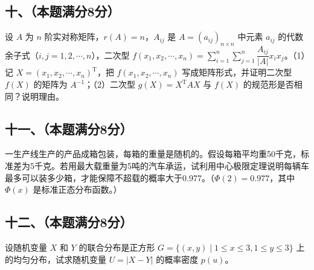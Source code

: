 \documentclass[UTF8,12pt]{ctexart}
\begin{document}
\subsection*{十、（本题满分8分）}

设 \(\displaystyle A\) 为 \(\displaystyle n\) 阶实对称矩阵，\(\displaystyle r(A)=n\)，\(\displaystyle A_{ij}\) 是 \(\displaystyle A=(a_{ij})_{n\times n}\) 中元素 \(\displaystyle a_{ij}\) 的代数余子式（\(\displaystyle i,\allowbreak j=1,\allowbreak 2,\allowbreak \cdots,\allowbreak n\)），二次型 \(\displaystyle f(x_1,\allowbreak x_2,\allowbreak \cdots,\allowbreak x_n)=\displaystyle \sum_{i=1}^n\displaystyle \sum_{j=1}^n\dfrac{\displaystyle A_{ij}}{\displaystyle |A|}x_ix_j\)。（1）记 \(\displaystyle X=(x_1,\allowbreak x_2,\allowbreak \cdots,\allowbreak x_n)^{\mathrm T}\)，把 \(\displaystyle f(x_1,\allowbreak x_2,\allowbreak \cdots,\allowbreak x_n)\) 写成矩阵形式，并证明二次型 \(\displaystyle f(X)\) 的矩阵为 \(\displaystyle A^{-1}\)；（2）二次型 \(\displaystyle g(X)=X^{\mathrm T}AX\) 与 \(\displaystyle f(X)\) 的规范形是否相同？说明理由。


\subsection*{十一、（本题满分8分）}

一生产线生产的产品成箱包装，每箱的重量是随机的。假设每箱平均重50千克，标准差为5千克。若用最大载重量为5吨的汽车承运，试利用中心极限定理说明每辆车最多可以装多少箱，才能保障不超载的概率大于0.977。（\(\displaystyle \Phi(2)=0.977\)，其中 \(\displaystyle \Phi(x)\) 是标准正态分布函数。）


\subsection*{十二、（本题满分8分）}

设随机变量 \(\displaystyle X\) 和 \(\displaystyle Y\) 的联合分布是正方形 \(\displaystyle G=\{(x,\allowbreak y)\mid1\le x\le3,\allowbreak 1\le y\le3\}\) 上的均匀分布，试求随机变量 \(\displaystyle U=|X-Y|\) 的概率密度 \(\displaystyle p(u)\)。
\end{document}
